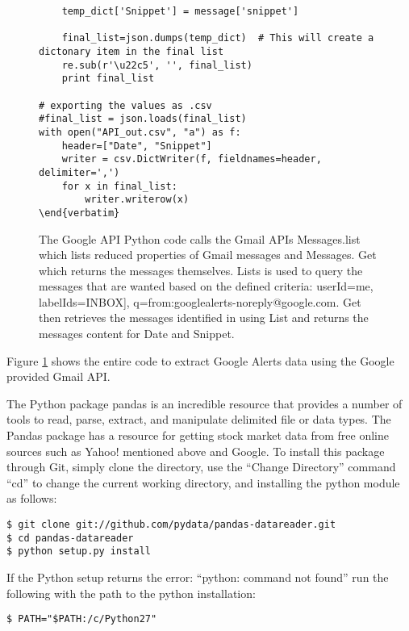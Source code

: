 \documentclass[sigconf]{acmart}
\begin{document}
\begin{figure}[htb]
\begin{lstlisting}
    temp_dict['Snippet'] = message['snippet']

    final_list=json.dumps(temp_dict)  # This will create a dictonary item in the final list
    re.sub(r'\u22c5', '', final_list)
    print final_list

# exporting the values as .csv
#final_list = json.loads(final_list)
with open("API_out.csv", "a") as f:
    header=["Date", "Snippet"]
    writer = csv.DictWriter(f, fieldnames=header, delimiter=',')
    for x in final_list:
        writer.writerow(x)
\end{verbatim}
\end{lstlisting}
\caption{The Google API Python code calls the Gmail APIs Messages.list which lists reduced properties of Gmail messages and Messages. Get which returns the messages themselves. Lists is used to query the messages that are wanted based on the defined criteria: userId=me, labelIds=INBOX], q=from:googlealerts-noreply@google.com. Get then retrieves the messages identified in using List and returns the messages content for Date and Snippet.}\label{c:googleapi}
\end{figure}

Figure \ref{c:googleapi} shows the entire code to extract Google Alerts data using the Google provided Gmail API.


The Python package pandas is an incredible resource that provides a number of tools to read, parse, extract, and manipulate delimited file or data types. The Pandas package has a resource for getting stock market data from free online sources such as Yahoo! mentioned above and Google. To install this package through Git, simply clone the directory, use the ``Change Directory'' command ``cd'' to change the current working directory, and installing the python module as follows: 

\begin{mdframed}[style=default]
\begin{lstlisting}
$ git clone git://github.com/pydata/pandas-datareader.git
$ cd pandas-datareader
$ python setup.py install
\end{lstlisting}
\end{mdframed}

If the Python setup returns the error: ``python: command not found'' run the following with the path to the python installation:
\begin{mdframed}[style=default]
\begin{lstlisting}
$ PATH="$PATH:/c/Python27"
\end{lstlisting}
\end{mdframed}
\end{document}
